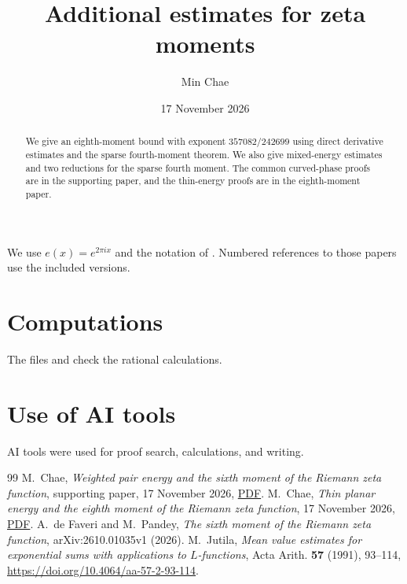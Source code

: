 \documentclass[11pt]{amsart}
\title[Additional estimates for zeta moments]{Additional estimates for zeta moments}
\author{Min Chae}
\date{17 November 2026}
\theoremstyle{definition}
\theoremstyle{remark}
\numberwithin{equation}{section}
\begin{document}
\raggedbottom
\setlength{\emergencystretch}{2em}
\renewcommand{\arraystretch}{1.35}
\begin{abstract}
We give an eighth-moment bound with exponent $357082/242699$ using
direct derivative estimates and the sparse fourth-moment theorem.
We also give mixed-energy estimates and two reductions for the sparse
fourth moment. The common curved-phase proofs are in the supporting
paper, and the thin-energy proofs are in the eighth-moment paper.
\end{abstract}
\maketitle
\enlargethispage{6pt}
We use $e(x)=e^{2\pi ix}$ and the notation of \cite{Weighted,Thin}.
Numbered references to those papers use the included versions.




\section*{Computations}
The files  and
 check the rational calculations.

\section*{Use of AI tools}
AI tools were used for proof search, calculations, and writing.

\begin{thebibliography}{99}
 M.~Chae,
\emph{Weighted pair energy and the sixth moment of the Riemann zeta function},
supporting paper, 17 November 2026, \href{https://github.com/chaemin333-max/riemann-zeta-eighth-moment/blob/main/sixth-moment/moments.pdf}{PDF}.
 M.~Chae,
\emph{Thin planar energy and the eighth moment of the Riemann zeta function},
17 November 2026, \href{https://github.com/chaemin333-max/riemann-zeta-eighth-moment/blob/main/paper/moments.pdf}{PDF}.
 A.~de Faveri and M.~Pandey,
\emph{The sixth moment of the Riemann zeta function},
arXiv:2610.01035v1 (2026).
 M.~Jutila,
\emph{Mean value estimates for exponential sums with applications to
$L$-functions}, Acta Arith. \textbf{57} (1991), 93--114,
\url{https://doi.org/10.4064/aa-57-2-93-114}.
\end{thebibliography}
\end{document}
